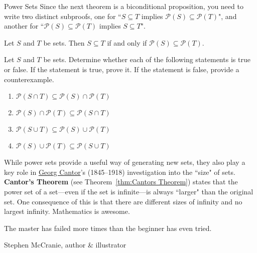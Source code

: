 \begin{section}{Power Sets}
Since the next theorem is a biconditional proposition, you need to write two distinct subproofs, one for ``$S\subseteq T$ implies $\mathcal{P}(S)\subseteq \mathcal{P}(T)$", and another for ``$\mathcal{P}(S)\subseteq \mathcal{P}(T)$ implies $S\subseteq T$".

\begin{theorem}
Let $S$ and $T$ be sets.  Then $S\subseteq T$ if and only if $\mathcal{P}(S)\subseteq \mathcal{P}(T)$.
\end{theorem}

\begin{problem}
Let $S$ and $T$ be sets. Determine whether each of the following statements is true or false. If the statement is true, prove it. If the statement is false, provide a counterexample.
\begin{enumerate}[label=\textrm{(\alph*)}]
\item $\mathcal{P}(S\cap T) \subseteq \mathcal{P}(S)\cap\mathcal{P}(T)$
\item $\mathcal{P}(S)\cap\mathcal{P}(T)\subseteq \mathcal{P}(S\cap T)$
\item $\mathcal{P}(S\cup T)\subseteq \mathcal{P}(S)\cup\mathcal{P}(T)$
\item $\mathcal{P}(S)\cup\mathcal{P}(T)\subseteq \mathcal{P}(S\cup T)$
\end{enumerate}
\end{problem}

While power sets provide a useful way of generating new sets, they also play a key role in \href{https://en.wikipedia.org/wiki/Georg_Cantor}{Georg Cantor}'s (1845--1918) investigation into the ``size" of sets. \textbf{Cantor's Theorem} (see Theorem~\ref{thm:Cantors Theorem}) states that the power set of a set---even if the set is infinite---is always ``larger" than the original set. One consequence of this is that there are different sizes of infinity and no largest infinity. Mathematics is awesome.

\epigraph{The master has failed more times than the beginner has even tried.}{Stephen McCranie, author \& illustrator}

\end{section}